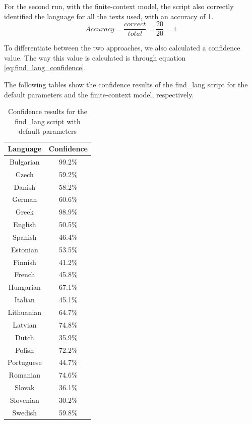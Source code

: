 \documentclass{article}
\begin{document}
For the second run, with the finite-context model, the script also correctly identified the language for all the texts used, with an accuracy of 1.
\begin{equation}
    \label{eq:find_lang_finite_context_accuracy}
    Accuracy = \frac{correct}{total} = \frac{20}{20} = 1
\end{equation}

To differentiate between the two approaches, we also calculated a confidence value. The way this value is calculated is through equation \ref{eq:find_lang_confidence}.

The following tables show the confidence results of the find_lang script for the default parameters and the finite-context model, respectively.


\begin{table}[H]
    \centering
    \begin{tabular}{|c|c|}
        \hline
        Language & Confidence \\
        \hline
        Bulgarian & 99.2\% \\
        Czech & 59.2\% \\
        Danish & 58.2\% \\
        German & 60.6\% \\
        Greek & 98.9\% \\
        English & 50.5\% \\
        Spanish & 46.4\% \\
        Estonian & 53.5\% \\
        Finnish & 41.2\% \\
        French & 45.8\% \\
        Hungarian & 67.1\% \\
        Italian & 45.1\% \\
        Lithuanian & 64.7\% \\
        Latvian & 74.8\% \\
        Dutch & 35.9\% \\
        Polish & 72.2\% \\
        Portuguese & 44.7\% \\
        Romanian & 74.6\% \\
        Slovak & 36.1\% \\
        Slovenian & 30.2\% \\
        Swedish & 59.8\% \\
        \hline
    \end{tabular}
    \caption{Confidence results for the find_lang script with default parameters}
    \label{tab:find_lang_default_confidence}
\end{table}
\end{document}
